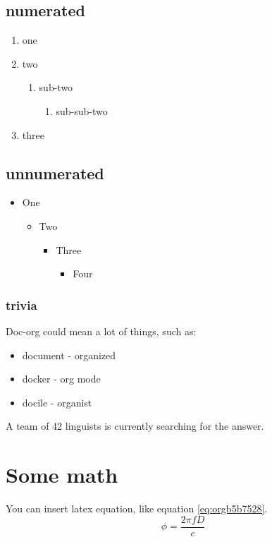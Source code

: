 \subsection{numerated}
\label{sec:org7be2f99}
\begin{enumerate}
\item one
\item two
\begin{enumerate}
\item sub-two
\begin{enumerate}
\item sub-sub-two
\end{enumerate}
\end{enumerate}
\item three
\end{enumerate}

\subsection{unnumerated}
\label{sec:org71ee39b}
\begin{itemize}
\item One
\begin{itemize}
\item Two
\begin{itemize}
\item Three
\begin{itemize}
\item Four
\end{itemize}
\end{itemize}
\end{itemize}
\end{itemize}

\subsubsection{trivia}
\label{sec:org84b63b7}
Doc-org could mean a lot of things, such as:
\begin{itemize}
\item document - organized
\item docker - org mode
\item docile - organist
\end{itemize}
A team of 42 linguists is currently searching for the answer.

\section{Some math}
\label{sec:org8f0a1c1}
You can insert latex equation, like equation \ref{eq:orgb5b7528}.
\begin{equation}
\label{eq:orgb5b7528}
\phi = \frac{2\pi fD}{c}
\end{equation}

